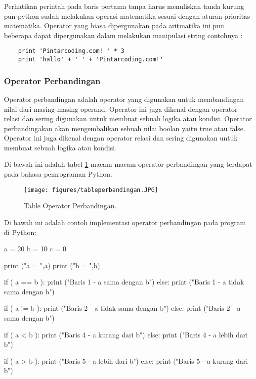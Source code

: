 \begin{eqation}
\begin{enumerate}
	
\end{enumerate}

Perhatikan perintah pada baris pertama tanpa harus menuliskan tanda kurung pun python sudah melakukan operasi matematika sesuai dengan aturan prioritas matematika. Operator yang biasa dipergunakan pada aritmatika ini pun beberapa dapat dipergunakan dalam melakukan manipulasi string contohnya :
\begin{verbatim}
	print 'Pintarcoding.com! ' * 3
	print 'hallo' + ' ' + 'Pintarcoding.com!'
\end{verbatim}




\subsubsection{Operator Perbandingan}
Operator perbandingan adalah operator yang digunakan untuk membandingan nilai dari masing-masing operand. Operator ini juga dikenal dengan operator relasi dan sering digunakan untuk membuat sebuah logika atau kondisi. Operator perbandingakan akan mengembalikan sebuah nilai boolan yaitu true atau false. Operator ini juga dikenal dengan operator relasi dan sering digunakan untuk membuat sebuah logika atau kondisi.

Di bawah ini adalah tabel \ref{tableperbandingan} macam-macam operator perbandingan yang terdapat pada bahasa pemrograman Python.
\begin{figure}[ht]
	\centerline{\texttt{[image: figures/tableperbandingan.JPG]}}
	\caption{Table Operator Perbandingan.}
	\label{tableperbandingan}
\end{figure}

Di bawah ini adalah contoh implementasi operator perbandingan pada program di Python:

a = 20
b = 10
c = 0

\begin{verbartim}
print ("a = ",a)
print ("b = ",b)

if ( a == b ):
   print ("Baris 1 - a sama dengan b")
else:
   print ("Baris 1 - a tidak sama dengan b")

if ( a != b ):
   print ("Baris 2 - a tidak sama dengan b")
else:
   print ("Baris 2 - a sama dengan b")

if ( a < b ):
   print ("Baris 4 - a kurang dari b") 
else:
   print ("Baris 4 - a lebih dari b")

if ( a > b ):
   print ("Baris 5 - a lebih dari b") 
else:
   print ("Baris 5 - a kurang dari b")


\end{verbartim}
\end{eqation}
